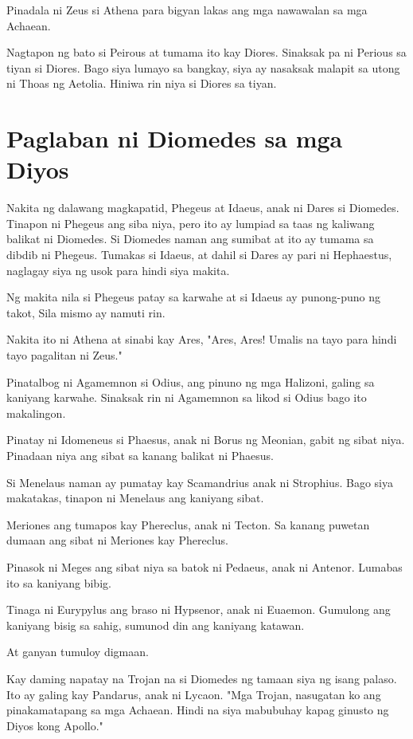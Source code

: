 \documentclass[12pt,letterpaper]{report}
\begin{document}
Pinadala ni Zeus si Athena para bigyan lakas ang mga nawawalan sa mga Achaean.

Nagtapon ng bato si Peirous at tumama ito kay Diores. Sinaksak pa ni Perious sa tiyan si Diores.
Bago siya lumayo sa bangkay, siya ay nasaksak malapit sa utong ni Thoas ng Aetolia.
Hiniwa rin niya si Diores sa tiyan.
\pagebreak

\chapter{Paglaban ni Diomedes sa mga Diyos}
Nakita ng dalawang magkapatid, Phegeus at Idaeus, anak ni Dares si Diomedes.
Tinapon ni Phegeus ang siba niya, pero ito ay lumpiad sa taas ng kaliwang balikat ni Diomedes.
Si Diomedes naman ang sumibat at ito ay tumama sa dibdib ni Phegeus. Tumakas si Idaeus,
at dahil si Dares ay pari ni Hephaestus, naglagay siya ng usok para hindi siya makita.

Ng makita nila si Phegeus patay sa karwahe at si Idaeus ay punong-puno ng takot,
Sila mismo ay namuti rin.

Nakita ito ni Athena at sinabi kay Ares, "Ares, Ares! Umalis na tayo para hindi tayo pagalitan ni Zeus."

Pinatalbog ni Agamemnon si Odius, ang pinuno ng mga Halizoni, galing sa kaniyang karwahe.
Sinaksak rin ni Agamemnon sa likod si Odius bago ito makalingon.

Pinatay ni Idomeneus si Phaesus, anak ni Borus ng Meonian, gabit ng sibat niya. Pinadaan niya ang sibat sa kanang balikat ni Phaesus.

Si Menelaus naman ay pumatay kay Scamandrius anak ni Strophius. Bago siya makatakas, tinapon ni Menelaus ang kaniyang sibat.

Meriones ang tumapos kay Phereclus, anak ni Tecton. Sa kanang puwetan dumaan ang sibat ni Meriones kay Phereclus.

Pinasok ni Meges ang sibat niya sa batok ni Pedaeus, anak ni Antenor. Lumabas ito sa kaniyang bibig.

Tinaga ni Eurypylus ang braso ni Hypsenor, anak ni Euaemon.
Gumulong ang kaniyang bisig sa sahig, sumunod din ang kaniyang katawan.

At ganyan tumuloy digmaan.

Kay daming napatay na Trojan na si Diomedes ng tamaan siya ng isang palaso. Ito ay galing kay Pandarus, anak ni Lycaon. "Mga Trojan,
nasugatan ko ang pinakamatapang sa mga Achaean. Hindi na siya mabubuhay kapag ginusto ng Diyos kong Apollo."
\end{document}
